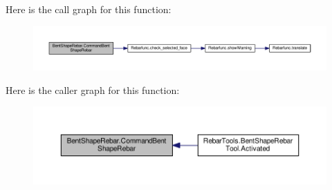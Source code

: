 Here is the call graph for this function\+:\nopagebreak
\begin{figure}[H]
\begin{center}
\leavevmode
\includegraphics[width=350pt]{namespaceBentShapeRebar_abc4f0ada7811da5cf9174551bc3c6b37_cgraph}
\end{center}
\end{figure}




Here is the caller graph for this function\+:\nopagebreak
\begin{figure}[H]
\begin{center}
\leavevmode
\includegraphics[width=350pt]{namespaceBentShapeRebar_abc4f0ada7811da5cf9174551bc3c6b37_icgraph}
\end{center}
\end{figure}



